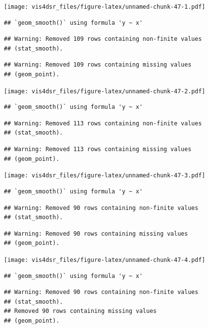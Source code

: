 \documentclass[
]{krantz}
\begin{document}
\texttt{[image: vis4dsr\_files/figure-latex/unnamed-chunk-47-1.pdf]}

\begin{verbatim}
## `geom_smooth()` using formula 'y ~ x'
\end{verbatim}

\begin{verbatim}
## Warning: Removed 109 rows containing non-finite values
## (stat_smooth).
\end{verbatim}

\begin{verbatim}
## Warning: Removed 109 rows containing missing values
## (geom_point).
\end{verbatim}

\texttt{[image: vis4dsr\_files/figure-latex/unnamed-chunk-47-2.pdf]}

\begin{verbatim}
## `geom_smooth()` using formula 'y ~ x'
\end{verbatim}

\begin{verbatim}
## Warning: Removed 113 rows containing non-finite values
## (stat_smooth).
\end{verbatim}

\begin{verbatim}
## Warning: Removed 113 rows containing missing values
## (geom_point).
\end{verbatim}

\texttt{[image: vis4dsr\_files/figure-latex/unnamed-chunk-47-3.pdf]}

\begin{verbatim}
## `geom_smooth()` using formula 'y ~ x'
\end{verbatim}

\begin{verbatim}
## Warning: Removed 90 rows containing non-finite values
## (stat_smooth).
\end{verbatim}

\begin{verbatim}
## Warning: Removed 90 rows containing missing values
## (geom_point).
\end{verbatim}

\texttt{[image: vis4dsr\_files/figure-latex/unnamed-chunk-47-4.pdf]}

\begin{verbatim}
## `geom_smooth()` using formula 'y ~ x'
\end{verbatim}

\begin{verbatim}
## Warning: Removed 90 rows containing non-finite values
## (stat_smooth).
## Removed 90 rows containing missing values
## (geom_point).
\end{verbatim}
\end{document}
